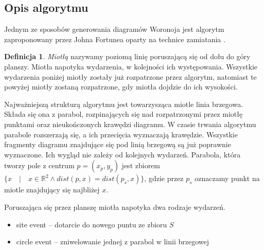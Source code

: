 \documentclass[declaration,shortabstract, inz]{iithesis}
\theoremstyle{definition} \newtheorem{definition}{Definicja}[]
\theoremstyle{plain} \newtheorem{remark}[definition]{Obserwacja}
\theoremstyle{plain} \newtheorem{theorem}[definition]{Twierdzenie}
\theoremstyle{plain} \newtheorem{example}{Przykład}[definition]
\theoremstyle{plain} \newtheorem{lemma}[definition]{Lemat}
\begin{document}
\subsection{Opis algorytmu}
Jednym ze sposobów  generowania diagramów Woronoja jest algorytm zaproponowany przez Johna Fortunea oparty na technice zamiatania \cite{miotla}. 

\begin{definition}
\textit{Miotłą} nazywamy poziomą linię poruszającą się od dołu do góry planszy. Miotła napotyka wydarzenia, w kolejności ich występowania. Wszystkie wydarzenia poniżej miotły zostały już rozpatrzone przez algorytm, natomiast te powyżej miotły zostaną rozpatrzone, gdy miotła dojdzie do ich wysokości.
\end{definition}

Najważniejszą strukturą algorytmu jest towarzysząca miotle linia brzegowa. Składa się ona z parabol, rozpinających się nad rozpatrzonymi przez miotłę punktami oraz nieukończonych krawędzi diagramu. W czasie trwania algorytmu parabole rozszerzają się, a ich przecięcia wyznaczają krawędzie. Wszystkie fragmenty diagramu znajdujące się pod linią brzegową są już poprawnie wyznaczone. Ich wygląd nie zależy od kolejnych wydarzeń. Parabola, która tworzy pole z centrum $p = (x_p, y_p)$ jest zbiorem $\{ x \quad | \quad x \in \mathbb{R}^2 \land dist(p, x) = dist(p_s, x) \}$, gdzie przez $p_s$ oznaczamy punkt na miotle znajdujący się najbliżej $x$. 

Poruszająca się przez planszę miotła napotyka dwa rodzaje wydarzeń.

\begin{itemize}
	\item site event -- dotarcie do nowego puntu ze zbioru $S$
	\item circle event -- zniwelowanie jednej z parabol w linii brzegowej
\end{itemize}
\end{document}
